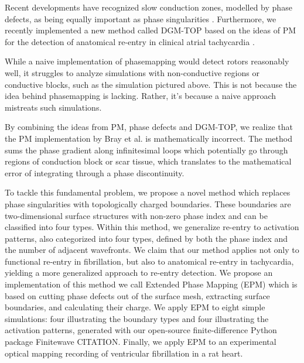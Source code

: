 \documentclass[twocolumn]{article}
\begin{document}
Recent developments have recognized slow conduction zones,
modelled by phase defects,
as being equally important as phase singularities \cite{tomii2021spatial, 2021experimental_phasedefect_method_arno}.
Furthermore, we recently implemented a new method called DGM-TOP based
on the ideas of PM for the detection of anatomical re-entry in clinical atrial tachycardia \cite{2025clinical_anatomical_hole_pm_vandenabeele}.

While a naive implementation of phasemapping would detect rotors
reasonably well,
it struggles to analyze simulations with non-conductive regions or
conductive blocks,
such as the simulation pictured above.
This is not because the idea behind phasemapping is lacking.
Rather, it's because a naive approach mistreats such simulations.

By combining the ideas from PM, phase defects and DGM-TOP, we realize that the PM implementation by Bray et al. is mathematically incorrect.
The method sums the phase gradient along infinitesimal loops which potentially go through regions of conduction block or scar tissue, which translates to the mathematical error of integrating through a phase discontinuity.

To tackle this fundamental problem, we propose a novel method which replaces phase singularities with topologically charged boundaries.
These boundaries are two-dimensional surface structures with non-zero phase index and can be classified into four types.
Within this method, we generalize re-entry to activation patterns, also categorized into four types, defined by both the phase index and the number of adjacent wavefronts.
We claim that our method applies not only to functional re-entry in fibrillation, but also to anatomical re-entry in tachycardia, yielding a more generalized approach to re-entry detection.
We propose an implementation of this method we call Extended Phase Mapping (EPM) which is based on cutting phase defects out of the surface mesh, extracting surface boundaries, and calculating their charge.
We apply EPM to eight simple simulations: four illustrating the boundary types and four illustrating the activation patterns, generated with our open-source finite-difference Python package Finitewave CITATION.
Finally, we apply EPM to an experimental optical mapping recording of ventricular fibrillation in a rat heart.
\end{document}
